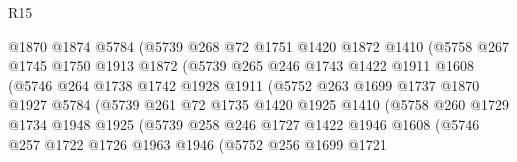 \begin{lexlean}{R15}
\begin{coremodule}
                        @1870
                        @1874
                        @5784
                        (@5739
                          @268
                          @72
                          @1751
                          @1420
                          @1872
                          @1410
                          (@5758
                            @267
                            @1745
                            @1750
                            @1913
                            @1872
                            (@5739
                              @265
                              @246
                              @1743
                              @1422
                              @1911
                              @1608
                              (@5746
                                @264
                                @1738
                                @1742
                                @1928
                                @1911
                                (@5752
                                  @263
                                  @1699
                                  @1737
                                  @1870
                                  @1927
                                  @5784
                                  (@5739
                                    @261
                                    @72
                                    @1735
                                    @1420
                                    @1925
                                    @1410
                                    (@5758
                                      @260
                                      @1729
                                      @1734
                                      @1948
                                      @1925
                                      (@5739
                                        @258
                                        @246
                                        @1727
                                        @1422
                                        @1946
                                        @1608
                                        (@5746
                                          @257
                                          @1722
                                          @1726
                                          @1963
                                          @1946
                                          (@5752
                                            @256
                                            @1699
                                            @1721

\end{coremodule}
\end{lexlean}
